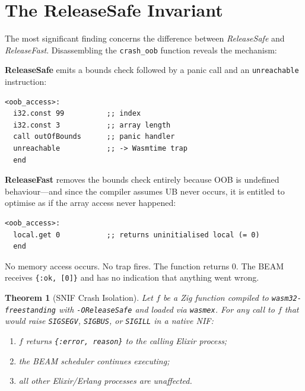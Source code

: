 \documentclass[11pt,a4paper]{article}
\newtheorem{theorem}{Theorem}
\begin{document}
\section{The ReleaseSafe Invariant}
\label{sec:mode-invariant}

The most significant finding concerns the difference between \textit{ReleaseSafe}
and \textit{ReleaseFast}. Disassembling the \texttt{crash\_oob} function
reveals the mechanism:

\textbf{ReleaseSafe} emits a bounds check followed by a panic call and an
\texttt{unreachable} instruction:

\begin{lstlisting}[language=WebAssembly, caption={crash\_oob in ReleaseSafe}]
<oob_access>:
  i32.const 99          ;; index
  i32.const 3           ;; array length
  call outOfBounds      ;; panic handler
  unreachable           ;; -> Wasmtime trap
  end
\end{lstlisting}

\textbf{ReleaseFast} removes the bounds check entirely because OOB is undefined
behaviour---and since the compiler assumes UB never occurs, it is entitled to
optimise as if the array access never happened:

\begin{lstlisting}[language=WebAssembly, caption={crash\_oob in ReleaseFast}]
<oob_access>:
  local.get 0           ;; returns uninitialised local (= 0)
  end
\end{lstlisting}

No memory access occurs. No trap fires. The function returns 0. The BEAM
receives \texttt{\{:ok, [0]\}} and has no indication that anything went wrong.

\begin{theorem}[SNIF Crash Isolation]
\label{thm:isolation}
Let $f$ be a Zig function compiled to \texttt{wasm32-freestanding} with
\texttt{-OReleaseSafe} and loaded via \texttt{wasmex}. For any call to $f$
that would raise \texttt{SIGSEGV}, \texttt{SIGBUS}, or \texttt{SIGILL} in a
native NIF:
\begin{enumerate}[label=(\roman*)]
  \item $f$ returns \texttt{\{:error, reason\}} to the calling Elixir process;
  \item the BEAM scheduler continues executing;
  \item all other Elixir/Erlang processes are unaffected.
\end{enumerate}
\end{theorem}
\end{document}
